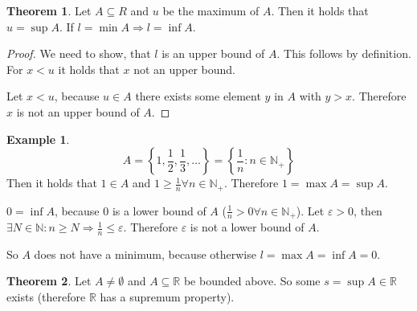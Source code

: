 \documentclass[a4paper,landscape,twocolumn]{article}
\theoremstyle{definition}
\newtheorem{theorem}{Theorem}
\newtheorem{ex}{Example}
\newcommand\set[1]{\left\{#1\right\}}
\begin{document}
\begin{theorem}
  Let $A \subseteq R$ and $u$ be the maximum of $A$. Then it holds that
  $u = \sup{A}$. If $l = \min{A} \Rightarrow l = \inf{A}$.
\end{theorem}

\begin{proof}
  We need to show, that $l$ is an upper bound of $A$.
  This follows by definition.
  For $x < u$ it holds that $x$ not an upper bound.

  Let $x < u$, because $u \in A$ there exists some element $y$ in $A$
  with $y > x$. Therefore $x$ is not an upper bound of $A$.
\end{proof}

\begin{ex}
  \[ A = \set{1, \frac12, \frac13, \ldots} = \set{\frac1n: n \in \mathbb N_+} \]
  Then it holds that $1 \in A$ and $1 \geq \frac1n \forall n \in \mathbb N_+$.
  Therefore $1 = \max{A} = \sup{A}$.

  $0 = \inf{A}$, because $0$ is a lower bound of $A$ ($\frac1n > 0 \forall n \in \mathbb N_+$).
  Let $\varepsilon > 0$, then $\exists N \in \mathbb N: n \geq N
  \Rightarrow \frac1n \leq \varepsilon$. Therefore $\varepsilon$ is not a lower bound of $A$.

  So $A$ does not have a minimum, because otherwise $l = \max{A} = \inf{A} = 0$.
\end{ex}

\begin{theorem}
  Let $A \neq \emptyset$ and $A \subseteq \mathbb R$ be bounded above.
  So some $s = \sup{A} \in \mathbb R$ exists (therefore $\mathbb R$ has a supremum property).
\end{theorem}
\end{document}

